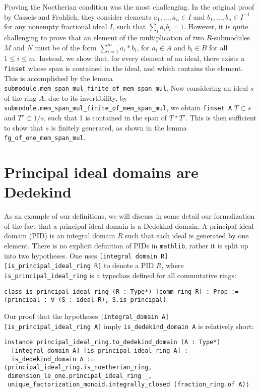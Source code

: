 \documentclass[a4paper,USenglish,cleveref, autoref, thm-restate]{lipics-v2021}
\newcommand{\lean}[1]{\texttt{#1}\xspace} %
\newcommand{\mathlib}{\texttt{mathlib}\xspace}
\begin{document}
Proving the Noetherian condition was the most challenging.
In the original proof by Cassels and Frohlich, they consider elements $a_1, \dots, a_n \in I$ and $b_1, \dots, b_n \in I^{-1}$ for any nonempty fractional ideal $I$,
such that $ \sum_i a_i b_i = 1 $.
However, it is quite challenging to prove that an element of the multiplication of two $R$-submodules $M$ and $N$ must be of the form $\sum_{i = 1}^m a_i*b_i$, for $a_i \in A$ and $b_i \in B$ for all $1 \leq i \leq m$.
Instead, we show that, for every element of an ideal, there exists a \lean{finset} whose span is contained in the ideal, and which contains the element.
This is accomplished by the lemma \lean{submodule.mem\_span\_mul\_finite\_of\_mem\_span\_mul}.
Now considering an ideal $s$ of the ring $A$, due to its invertibility, by \lean{submodule.mem\_span\_mul\_finite\_of\_mem\_span\_mul}, we obtain \lean{finset A} $T \subset s$ and $T' \subset 1/s$, such that 1 is contained in the span of $T*T'$.
This is then sufficient to show that $s$ is finitely generated, as shown in the lemma \lean{fg\_of\_one\_mem\_span\_mul}.

\section{Principal ideal domains are Dedekind}

As an example of our definitions, we will discuss in some detail our formalization of the fact that a principal ideal domain is a Dedekind domain.
A principal ideal domain (PID) is an integral domain $R$ such that each ideal is generated by one element.
There is no explicit definition of PIDs in \mathlib, rather it is split up into two hypotheses.
One uses \lean{[integral domain R] [is\_principal\_ideal\_ring R]} to denote a PID $R$,
where \lean{is\_principal\_ideal\_ring} is a typeclass defined for all commutative rings:
\begin{lstlisting}
class is_principal_ideal_ring (R : Type*) [comm_ring R] : Prop :=
(principal : ∀ (S : ideal R), S.is_principal)
\end{lstlisting}

Our proof that the hypotheses \lean{[integral\_domain A] [is\_principal\_ideal\_ring A]} imply \lean{is\_dedekind\_domain A} is relatively short:
\begin{lstlisting}
instance principal_ideal_ring.to_dedekind_domain (A : Type*)
  [integral_domain A] [is_principal_ideal_ring A] :
  is_dedekind_domain A :=
⟨principal_ideal_ring.is_noetherian_ring,
 dimension_le_one.principal_ideal_ring _,
 unique_factorization_monoid.integrally_closed (fraction_ring.of A)⟩
\end{lstlisting}
\end{document}
